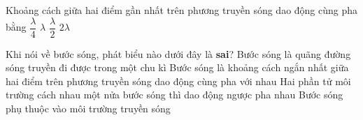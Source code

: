 \begin{ex}%

Khoảng cách giữa hai điểm gần nhất trên phương truyền sóng dao động cùng pha bằng
\choice
{$\dfrac{\lambda}{4}$}
{\True $\lambda$}
{$\dfrac{\lambda}{2}$}
{$2\lambda$}
\end{ex} 
\begin{ex}%
Khi nói về bước sóng, phát biểu nào dưới đây là \textbf{sai}?
\choice
{Bước sóng là quãng đường sóng truyền đi được trong một chu kì}
{Bước sóng là khoảng cách ngắn nhất giữa hai điểm trên phương truyền sóng dao động cùng pha với nhau}
{\True Hai phần tử môi trường cách nhau một nửa bước sóng thì dao động ngược pha nhau}
{Bước sóng phụ thuộc vào môi trường truyền sóng}
\end{ex} 

